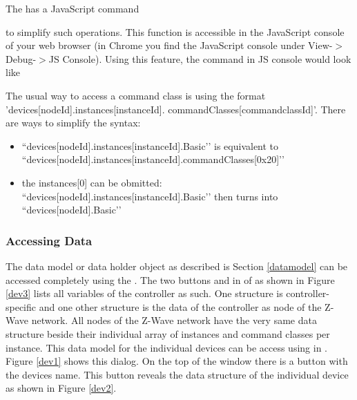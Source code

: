 The \zweui has a JavaScript command 
\begin{quote}
\end{quote}
to simplify such operations. 
This function is accessible in the JavaScript console of your web browser 
(in Chrome you find the JavaScript console under View-$>$Debug-$>$JS Console). 
Using this feature, the command in JS console would look like

\begin{quote}
\end{quote}


The usual way to access a command class is using the format \\'devices[nodeId].instances[instanceId].
commandClasses[commandclassId]'.
There are ways to simplify the syntax:

\begin{itemize}
\item ``devices[nodeId].instances[instanceId].Basic’’ is equivalent to \\
``devices[nodeId].instances[instanceId].commandClasses[0x20]’’
\item the instances[0] can be obmitted: 
``devices[nodeId].instances[instanceId].Basic’’ then turns into ``devices[nodeId].Basic’’
\end{itemize}


\subsubsection{Accessing Data}

The data model or data holder object as described is Section \ref{datamodel} can be 
accessed completely using the \zweui. The two 
buttons  and  in 
 of \zweui as shown in Figure \ref{dev3}  lists all variables of the 
controller as such. One structure is controller-specific and one other structure is the 
data of the controller as node of the Z-Wave network.
All nodes of the Z-Wave network have the very same data structure beside their individual 
array of instances and command classes per instance. This data model for the individual 
devices can be access using  in \zweui. 
Figure \ref{dev1} shows this dialog. On the top of the window there is a button with 
the devices name. This button reveals the data structure of the individual device 
as shown in Figure \ref{dev2}.


